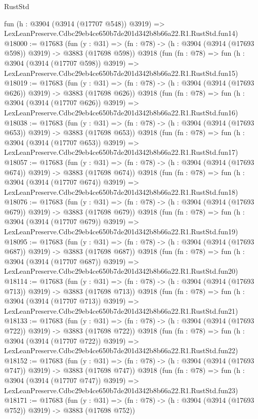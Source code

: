 \begin{lexlean}{RustStd}
\begin{coremodule}
    fun (h : @3904 (@3914 (@17707 @548)) @3919) =>
    LexLeanPreserve.Cdbc29eb4ce650b7de201d342b8b66a22.R1.RustStd.fun14)
@18000 := @17683
    (fun (y : @31) => (fn : @78) -> (h : @3904 (@3914 (@17693 @598)) @3919) -> @3883 (@17698 @598))
    @3918
    (fun (fn : @78) =>
    fun (h : @3904 (@3914 (@17707 @598)) @3919) =>
    LexLeanPreserve.Cdbc29eb4ce650b7de201d342b8b66a22.R1.RustStd.fun15)
@18019 := @17683
    (fun (y : @31) => (fn : @78) -> (h : @3904 (@3914 (@17693 @626)) @3919) -> @3883 (@17698 @626))
    @3918
    (fun (fn : @78) =>
    fun (h : @3904 (@3914 (@17707 @626)) @3919) =>
    LexLeanPreserve.Cdbc29eb4ce650b7de201d342b8b66a22.R1.RustStd.fun16)
@18038 := @17683
    (fun (y : @31) => (fn : @78) -> (h : @3904 (@3914 (@17693 @653)) @3919) -> @3883 (@17698 @653))
    @3918
    (fun (fn : @78) =>
    fun (h : @3904 (@3914 (@17707 @653)) @3919) =>
    LexLeanPreserve.Cdbc29eb4ce650b7de201d342b8b66a22.R1.RustStd.fun17)
@18057 := @17683
    (fun (y : @31) => (fn : @78) -> (h : @3904 (@3914 (@17693 @674)) @3919) -> @3883 (@17698 @674))
    @3918
    (fun (fn : @78) =>
    fun (h : @3904 (@3914 (@17707 @674)) @3919) =>
    LexLeanPreserve.Cdbc29eb4ce650b7de201d342b8b66a22.R1.RustStd.fun18)
@18076 := @17683
    (fun (y : @31) => (fn : @78) -> (h : @3904 (@3914 (@17693 @679)) @3919) -> @3883 (@17698 @679))
    @3918
    (fun (fn : @78) =>
    fun (h : @3904 (@3914 (@17707 @679)) @3919) =>
    LexLeanPreserve.Cdbc29eb4ce650b7de201d342b8b66a22.R1.RustStd.fun19)
@18095 := @17683
    (fun (y : @31) => (fn : @78) -> (h : @3904 (@3914 (@17693 @687)) @3919) -> @3883 (@17698 @687))
    @3918
    (fun (fn : @78) =>
    fun (h : @3904 (@3914 (@17707 @687)) @3919) =>
    LexLeanPreserve.Cdbc29eb4ce650b7de201d342b8b66a22.R1.RustStd.fun20)
@18114 := @17683
    (fun (y : @31) => (fn : @78) -> (h : @3904 (@3914 (@17693 @713)) @3919) -> @3883 (@17698 @713))
    @3918
    (fun (fn : @78) =>
    fun (h : @3904 (@3914 (@17707 @713)) @3919) =>
    LexLeanPreserve.Cdbc29eb4ce650b7de201d342b8b66a22.R1.RustStd.fun21)
@18133 := @17683
    (fun (y : @31) => (fn : @78) -> (h : @3904 (@3914 (@17693 @722)) @3919) -> @3883 (@17698 @722))
    @3918
    (fun (fn : @78) =>
    fun (h : @3904 (@3914 (@17707 @722)) @3919) =>
    LexLeanPreserve.Cdbc29eb4ce650b7de201d342b8b66a22.R1.RustStd.fun22)
@18152 := @17683
    (fun (y : @31) => (fn : @78) -> (h : @3904 (@3914 (@17693 @747)) @3919) -> @3883 (@17698 @747))
    @3918
    (fun (fn : @78) =>
    fun (h : @3904 (@3914 (@17707 @747)) @3919) =>
    LexLeanPreserve.Cdbc29eb4ce650b7de201d342b8b66a22.R1.RustStd.fun23)
@18171 := @17683
    (fun (y : @31) => (fn : @78) -> (h : @3904 (@3914 (@17693 @752)) @3919) -> @3883 (@17698 @752))

\end{coremodule}
\end{lexlean}
